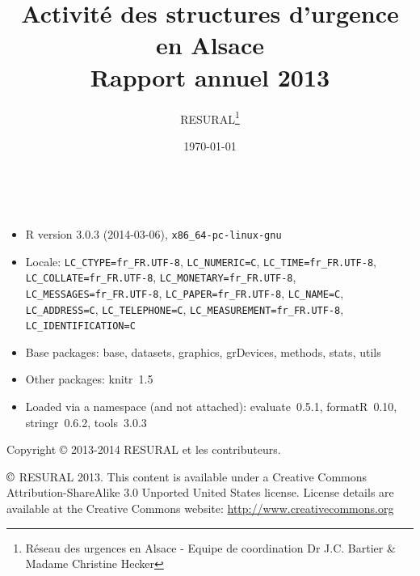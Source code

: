 \documentclass[12pt,english,french,twoside]{book}\usepackage[]{graphicx}\usepackage[]{color}
\begin{document}


\frontmatter

\title{Activité des structures d'urgence en Alsace \\Rapport annuel 2013}
\author{RESURAL\thanks{Réseau des urgences en Alsace - Equipe de coordination Dr J.C.
Bartier \& Madame Christine Hecker}}
\date{\today}
\maketitle


%

\newpage
~\vfill

\begin{itemize}\raggedright
  \item R version 3.0.3 (2014-03-06), \verb|x86_64-pc-linux-gnu|
  \item Locale: \verb|LC_CTYPE=fr_FR.UTF-8|, \verb|LC_NUMERIC=C|, \verb|LC_TIME=fr_FR.UTF-8|, \verb|LC_COLLATE=fr_FR.UTF-8|, \verb|LC_MONETARY=fr_FR.UTF-8|, \verb|LC_MESSAGES=fr_FR.UTF-8|, \verb|LC_PAPER=fr_FR.UTF-8|, \verb|LC_NAME=C|, \verb|LC_ADDRESS=C|, \verb|LC_TELEPHONE=C|, \verb|LC_MEASUREMENT=fr_FR.UTF-8|, \verb|LC_IDENTIFICATION=C|
  \item Base packages: base, datasets, graphics, grDevices,
    methods, stats, utils
  \item Other packages: knitr~1.5
  \item Loaded via a namespace (and not attached): evaluate~0.5.1,
    formatR~0.10, stringr~0.6.2, tools~3.0.3
\end{itemize}



Copyright \copyright{} 2013-2014 RESURAL et les contributeurs.

\noindent $\copyright$ RESURAL 2013. This content is available under a Creative Commons Attribution-ShareAlike 3.0 Unported United States license. License details are available at the Creative Commons website: \url{http://www.creativecommons.org} \\
\end{document}
